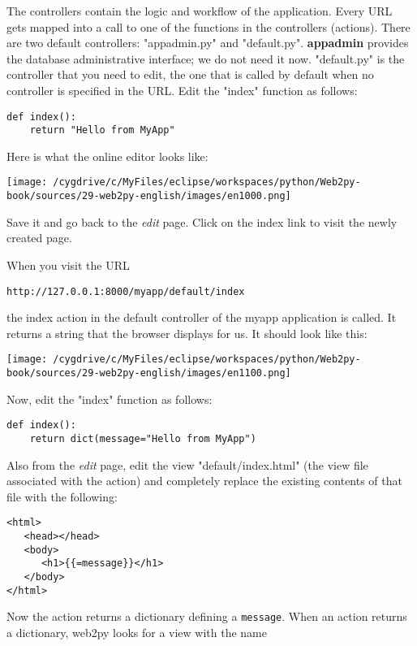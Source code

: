 \documentclass[justified,sixbynine,notoc]{tufte-book}
\def\ft{\small\tt}
\begin{document}
\begin{fullwidth}
The controllers contain the logic and workflow of the application. Every URL gets mapped into a call to one of the functions in the controllers (actions). There are two default controllers: "appadmin.py" and "default.py". {\bf appadmin} provides the database administrative interface; we do not need it now. "default.py" is the controller that you need to edit, the one that is called by default when no controller is specified in the URL. Edit the "index" function as follows:
\begin{lstlisting}
def index():
    return "Hello from MyApp"
\end{lstlisting}

Here is what the online editor looks like:


\goodbreak\begin{center}\texttt{[image: /cygdrive/c/MyFiles/eclipse/workspaces/python/Web2py-book/sources/29-web2py-english/images/en1000.png]}\end{center}


Save it and go back to the {\it edit} page. Click on the index link to visit the newly created page.

When you visit the URL
\begin{lstlisting}[keywords={}]
http://127.0.0.1:8000/myapp/default/index
\end{lstlisting}
\noindent the index action in the default controller of the myapp application is called. It returns a string that the browser displays for us. It should look like this:


\goodbreak\begin{center}\texttt{[image: /cygdrive/c/MyFiles/eclipse/workspaces/python/Web2py-book/sources/29-web2py-english/images/en1100.png]}\end{center}


Now, edit the "index" function as follows:
\begin{lstlisting}
def index():
    return dict(message="Hello from MyApp")
\end{lstlisting}

Also from the {\it edit} page, edit the view "default/index.html" (the view file associated with the action) and completely replace the existing contents of that file with the following:
\begin{lstlisting}[keywords={}]
<html>
   <head></head>
   <body>
      <h1>{{=message}}</h1>
   </body>
</html>
\end{lstlisting}

Now the action returns a dictionary defining a {\ft message}. When an action returns a dictionary, web2py looks for a view with the name


\end{fullwidth}
\end{document}
